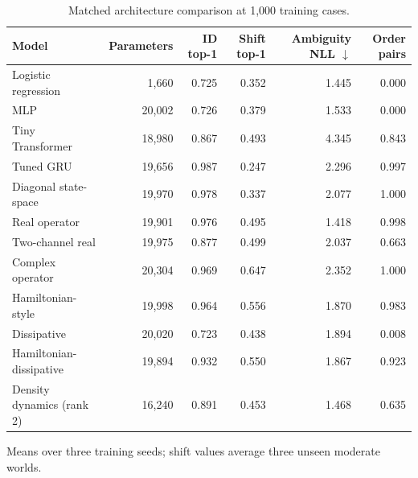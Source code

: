 \begin{table}[t]
\centering
\caption{Matched architecture comparison at 1,000 training cases.}
\label{tab:architecture_results}
\begin{tabular}{lrrrrr}
\toprule
Model & Parameters & ID top-1 & Shift top-1 & Ambiguity NLL $\downarrow$ & Order pairs \\
\midrule
Logistic regression & 1,660 & 0.725 & 0.352 & 1.445 & 0.000 \\
MLP & 20,002 & 0.726 & 0.379 & 1.533 & 0.000 \\
Tiny Transformer & 18,980 & 0.867 & 0.493 & 4.345 & 0.843 \\
Tuned GRU & 19,656 & 0.987 & 0.247 & 2.296 & 0.997 \\
Diagonal state-space & 19,970 & 0.978 & 0.337 & 2.077 & 1.000 \\
Real operator & 19,901 & 0.976 & 0.495 & 1.418 & 0.998 \\
Two-channel real & 19,975 & 0.877 & 0.499 & 2.037 & 0.663 \\
Complex operator & 20,304 & 0.969 & 0.647 & 2.352 & 1.000 \\
Hamiltonian-style & 19,998 & 0.964 & 0.556 & 1.870 & 0.983 \\
Dissipative & 20,020 & 0.723 & 0.438 & 1.894 & 0.008 \\
Hamiltonian-dissipative & 19,894 & 0.932 & 0.550 & 1.867 & 0.923 \\
Density dynamics (rank 2) & 16,240 & 0.891 & 0.453 & 1.468 & 0.635 \\
\bottomrule
\end{tabular}
\begin{minipage}{0.96\linewidth}\footnotesize Means over three training seeds; shift values average three unseen moderate worlds.\end{minipage}
\end{table}
